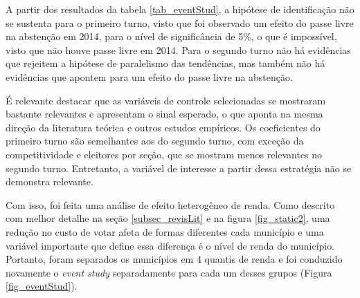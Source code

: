 A partir dos resultados da tabela \ref{tab_eventStud}, a hipótese de identificação não se sustenta para o primeiro turno, visto que foi observado um efeito do passe livre na abstenção em 2014, para o nível de significância de 5\%, o que é impossível, visto que não houve passe livre em 2014. Para o segundo turno não há evidências que rejeitem a hipótese de paralelismo das tendências, mas também não há evidências que apontem para um efeito do passe livre na abstenção.



É relevante destacar que as variáveis de controle selecionadas se mostraram bastante relevantes e apresentam o sinal esperado, o que aponta na mesma direção da literatura teórica e outros estudos empíricos. Os coeficientes do primeiro turno são semelhantes aos do segundo turno, com exceção da competitividade e eleitores por seção, que se mostram menos relevantes no segundo turno. Entretanto, a variável de interesse a partir dessa estratégia não se demonstra relevante.

Com isso, foi feita uma análise de efeito heterogêneo de renda. Como descrito com melhor detalhe na seção \ref{subsec_revisLit} e na figura \ref{fig_static2}, uma redução no custo de votar afeta de formas diferentes cada município e uma variável importante que define essa diferença é o nível de renda do município. Portanto, foram separados os municípios em 4 quantis de renda e foi conduzido novamente o \textit{event study} separadamente para cada um desses grupos (Figura \ref{fig_eventStud}). 

